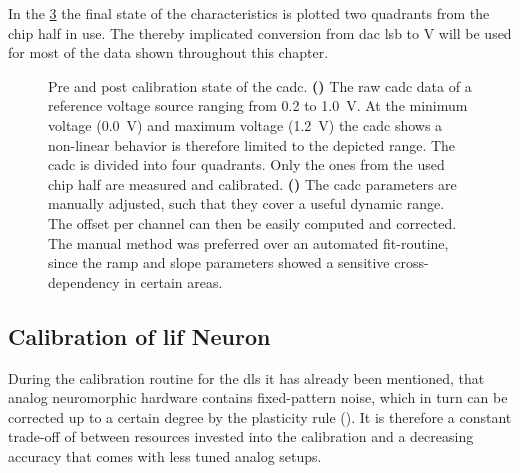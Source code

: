 In the \cref{cadccalibration} the final state of the characteristics is plotted two quadrants from the chip half in use. The thereby implicated conversion from \gls{dac} lsb to \si{\V} will be used for most of the data shown throughout this chapter.
\begin{figure}
	\begin{subfigure}{0.65\textwidth}
		\caption{}
		
		\label{precadccalib}
	\end{subfigure}
	\begin{subfigure}{0.35\textwidth}
		\caption{}
		
		\label{postcadccalib}
	\end{subfigure}
	\caption[Pre and post calibration state of the \gls{cadc}]{Pre and post calibration state of the \gls{cadc}. \textbf{()} The raw cadc data of a reference voltage source ranging from 0.2 to \SI{1.0}{\V}. At the minimum voltage (\SI{0.0}{\V}) and maximum voltage (\SI{1.2}{\V}) the \gls{cadc} shows a non-linear behavior is therefore limited to the depicted range. The \gls{cadc} is divided into four quadrants. Only the ones from the used chip half are measured and calibrated. \textbf{()} The cadc parameters are manually adjusted, such that they cover a useful dynamic range. The offset per channel can then be easily computed and corrected. The manual method was preferred over an automated fit-routine, since the ramp and slope parameters showed a sensitive cross-dependency in certain areas.}
	\label{cadccalibration}
\end{figure}

\subsection{Calibration of \gls{lif} Neuron}
During the calibration routine for the \gls{dls} it has already been mentioned, that analog neuromorphic hardware contains fixed-pattern noise, which in turn can be corrected up to a certain degree by the plasticity rule (\citealp{wunderlich2019advantages}). It is therefore a constant trade-off of between resources invested into the calibration and a decreasing accuracy that comes with less tuned analog setups.

